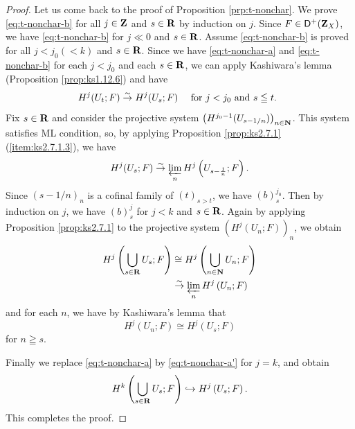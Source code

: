 \begin{proof}
  Let us come back to the proof of 
  Proposition \ref{prp:t-nonchar}. 
  We prove \ref{eq:t-nonchar-b} for 
  all \(j\in\zz\) and \(s\in\rr\) by induction on \(j\). 
  Since \(F\in\Dompl(\zz_X)\), 
  we have \ref{eq:t-nonchar-b} for \(j\ll 0\) and \(s\in\rr\). 
  Assume \ref{eq:t-nonchar-b} is proved for 
  all \(j< j_{0} (<k)\) and \(s\in\rr\). 
  Since we have \ref{eq:t-nonchar-a} and \ref{eq:t-nonchar-b} 
  for each \(j< j_{0}\) and each \(s\in\rr\), 
  we can apply 
  Kashiwara's lemma (Proposition \ref{prop:ks1.12.6}) 
  and have\[
    H^{j}(U_{t};F)\simar H^{j}(U_{s};F) 
    \quad
    \text{ for \(j< j_{0}\) and \(s\leqq t\). }
  \]
  Fix \(s\in\rr\) and consider the projective system \(
    \left(H^{j_{0}-1}(U_{s-1/n})\right)_{n\in\nn}
  \). This system satisfies ML condition, 
  so, by applying 
  Proposition \ref{prop:ks2.7.1} (\ref{item:ks2.7.1.3}), 
  we have \[
    H^{j}(U_{s};F)
    \simar 
    \prolim[n]H^{j}\left(U_{s-\frac{1}{n}};F\right). 
  \]
  Since \((s-1/n)_{n}\) is a cofinal family of \((t)_{s>t}\), 
  we have \((b)_{s}^{j_{0}}\). 
  Then by induction on \(j\), 
  we have \((b)_{s}^{j}\) for \(j<k\) and \(s\in\rr\). 
  Again by applying Proposition \ref{prop:ks2.7.1} to the 
  projective system \(\left(H^{j}(U_{n};F)\right)_{n}\), 
  we obtain 
  \begin{align*}
    H^{j}\left(\bigcup_{s\in\rr}U_{s};F\right)
    &\cong
    H^{j}\left(\bigcup_{n\in\nn}U_{n};F\right)\\
    &\simar 
    \prolim[n]H^{j}\left(U_{n};F\right)
  \end{align*}
  and for each \(n\), we have by Kashiwara's lemma that
  \[
    H^{j}\left(U_{n};F\right)
    \cong
    H^{j}(U_{s};F)
  \]
  for \(n\geqq s\).

  Finally we replace \ref{eq:t-nonchar-a} by 
  \ref{eq:t-nonchar-a'} for \(j=k\), and obtain
  \[
    H^{k}\left(\bigcup_{s\in\rr}U_{s};F\right)
    \hookrightarrow
    H^{j}\left(U_{s};F\right).
  \]
  This completes the proof. 
\end{proof}













